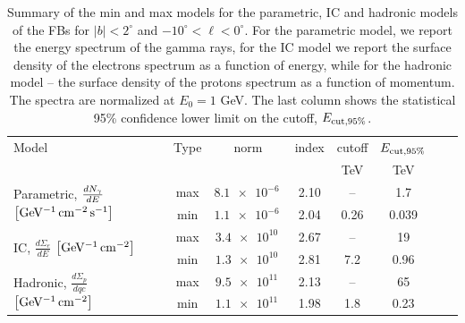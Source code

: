 \begin{table}
  \begin{center}
    \caption{Summary of the min and max models for the parametric, 
    IC and hadronic models of the FBs for $|b| < 2^\circ$ and $-10^\circ < \ell < 0^\circ$. 
    For the parametric model, we report the energy spectrum of the gamma rays,
    for the IC model we report the surface density of the electrons spectrum as a function of energy,
    while for the hadronic model -- the surface density of the protons spectrum as a function of momentum.
    The spectra are normalized at $E_0 = 1$ GeV. The last column shows the statistical 95\% confidence lower limit on the cutoff, $E_{\rm cut, 95\%}$.}
    \label{tab:summary}
    \begin{tabular}{| l |c|c|c|c|c|c|c|} %
     	\hline
		 {\hspace{2cm}Model} & Type  & norm & index & cutoff & $E_{\rm cut, 95\%}$ \\ 
		       &        &   &  & {\rm\small TeV} & {\rm\small TeV}\\ 
		\hline
  		\multirow{2}{*}{Parametric, $\frac{dN_\gamma}{dE}$ {\small $\left[{\rm {GeV^{-1}\, cm^{-2}\, s^{-1} }}\right]$}} & max &  $\SI{8.1e-6}{}$ & 2.10 &  -- & 1.7 \\ 
		& min & $\SI{1.1e-6}{}$& 2.04 & 0.26 & 0.039 \\ 
 		\hline
  		\multirow{2}{*}{IC, $\frac{d\Sigma_e}{dE}$ {\small $\left[{\rm {GeV^{-1}\, cm^{-2}}}\right]$}} & max & $\SI{3.4e10}{}$ & 2.67 &  -- & 19 \\ 
		& min & $\SI{1.3e10}{}$ & 2.81 &  7.2 & 0.96 \\ 
 		\hline
  		\multirow{2}{*}{Hadronic, $\frac{d\Sigma_p}{dqc}$ {\small $\left[{\rm {GeV^{-1}\, cm^{-2}}}\right]$}} & max & $\SI{9.5e11}{}$ & 2.13 &  -- &65 \\ 
		& min & $\SI{1.1e11}{}$ & 1.98 &  1.8 & 0.23  \\ 
 \hline
    \end{tabular}
  \end{center}
\end{table}




